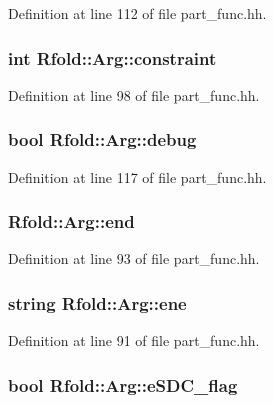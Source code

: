 Definition at line 112 of file part\+\_\+func.\+hh.

\hypertarget{class_rfold_1_1_arg_ab05512b7f96ce930ac13b873e7c298b1}{
\subsubsection[{constraint}]{\setlength{\rightskip}{0pt plus 5cm}int Rfold\+::\+Arg\+::constraint}}\label{class_rfold_1_1_arg_ab05512b7f96ce930ac13b873e7c298b1}


Definition at line 98 of file part\+\_\+func.\+hh.

\hypertarget{class_rfold_1_1_arg_ad6f2d65fd94879a530699ee4680e5d63}{
\subsubsection[{debug}]{\setlength{\rightskip}{0pt plus 5cm}bool Rfold\+::\+Arg\+::debug}}\label{class_rfold_1_1_arg_ad6f2d65fd94879a530699ee4680e5d63}


Definition at line 117 of file part\+\_\+func.\+hh.

\hypertarget{class_rfold_1_1_arg_ad5641c6dff38e98a3dadb60223a4b630}{
\subsubsection[{end}]{ Rfold\+::\+Arg\+::end}}\label{class_rfold_1_1_arg_ad5641c6dff38e98a3dadb60223a4b630}


Definition at line 93 of file part\+\_\+func.\+hh.

\hypertarget{class_rfold_1_1_arg_a3fc1f86f5f3f7b2572392b547a2ef6a9}{
\subsubsection[{ene}]{\setlength{\rightskip}{0pt plus 5cm}string Rfold\+::\+Arg\+::ene}}\label{class_rfold_1_1_arg_a3fc1f86f5f3f7b2572392b547a2ef6a9}


Definition at line 91 of file part\+\_\+func.\+hh.

\hypertarget{class_rfold_1_1_arg_addf5237deb4bf9025fa747fbd2c33366}{
\subsubsection[{e\+S\+D\+C\+\_\+flag}]{\setlength{\rightskip}{0pt plus 5cm}bool Rfold\+::\+Arg\+::e\+S\+D\+C\+\_\+flag}}\label{class_rfold_1_1_arg_addf5237deb4bf9025fa747fbd2c33366}


